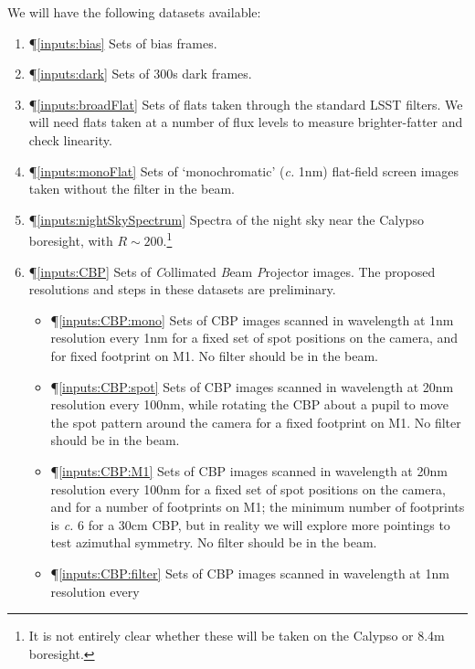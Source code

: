 \documentclass[12pt]{article}
\makeatletter
\renewcommand{\c}{\textit{c.}\xspace}
\newcommand{\addLabel}[1]{\P \label{#1}\ref{#1}}
\newcommand{\addMyLabel}[2]{\P \myLabel{#1}{#2}\ref{#1}}
\newcommand{\myLabel}[2]{\def\@currentlabel{#2}\label{#1}}
\makeatother
\begin{document}
We will have the following datasets available:
\begin{enumerate}
   \item\addLabel{inputs:bias} Sets of bias frames.
   \item\addLabel{inputs:dark} Sets of 300s dark frames.
   \item\addLabel{inputs:broadFlat} Sets of flats taken through the standard LSST filters.  We will
     need flats taken at a number of flux levels to measure brighter-fatter and check linearity.
   \item\addLabel{inputs:monoFlat} Sets of `monochromatic' (\c 1nm) flat-field screen images taken
     without the filter in the beam.
   \item\addLabel{inputs:nightSkySpectrum} Spectra of the night sky near the Calypso boresight, with $R \sim
  200$.\footnote{It is not entirely clear whether these will be taken on the Calypso or 8.4m boresight.}
   \item\addLabel{inputs:CBP} Sets of \textit{C}ollimated \textit{B}eam \textit{P}rojector images.
     The proposed resolutions and steps in these datasets are preliminary.
     \begin{itemize}
     \item\addMyLabel{inputs:CBP:mono}{\arabic{enumi}a} Sets of CBP images scanned in wavelength at 1nm resolution every
       1nm for a fixed set of spot positions on the camera, and for fixed footprint on M1.  No filter
       should be in the beam.
     \item\addMyLabel{inputs:CBP:spot}{\arabic{enumi}b} Sets of CBP images scanned in wavelength at 20nm resolution every
       100nm, while rotating the CBP about a pupil to move the spot pattern around the camera for a
       fixed footprint on M1.  No filter should be in the beam.
     \item\addMyLabel{inputs:CBP:M1}{\arabic{enumi}c} Sets of CBP images scanned in wavelength at 20nm resolution every
       100nm for a fixed set of spot positions on the camera, and for a number of footprints on M1; the
       minimum number of footprints is \c 6 for a 30cm CBP, but in reality we will explore more pointings to
       test azimuthal symmetry. No filter should be in the beam.
     \item\addMyLabel{inputs:CBP:filter}{\arabic{enumi}d} Sets of CBP images scanned in wavelength at 1nm resolution every

\end{itemize}
\end{enumerate}
\end{document}

